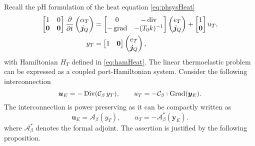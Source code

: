 Recall the pH formulation of the heat equation \eqref{eq:phsysHeat}
\begin{equation}
\begin{aligned}
\begin{bmatrix}
1 & 0 \\
\bm{0} & \bm{0} \\
\end{bmatrix}
\diffp{}{t}
\begin{pmatrix}
\alpha_T \\
\bm{j}_Q \\
\end{pmatrix} &= 
\begin{bmatrix}
0 & -\div \\
-\grad & -(T_0 k)^{-1} \\
\end{bmatrix}
\begin{pmatrix}
e_T \\
\bm{j}_Q \\
\end{pmatrix} + 
\begin{bmatrix}
1 \\
\bm{0} \\
\end{bmatrix} u_T, \\
y_T &= \begin{bmatrix}
1 & \bm{0} \\
\end{bmatrix} \begin{pmatrix}
e_T \\
\bm{j}_Q \\
\end{pmatrix},
\end{aligned}
\end{equation} 
with Hamiltonian $H_T$ defined in \eqref{eq:hamHeat}. The linear thermoelastic problem can be expressed as a coupled port-Hamiltonian system.  Consider the following interconnection
\begin{equation}
\bm{u}_E = - \Div(\mathcal{C}_\beta \, y_T), \qquad
u_T = - \mathcal{C}_\beta \cddot\Grad(\bm{y}_E). 
\end{equation}
The interconnection is power preserving as it can be compactly written as 
\begin{equation*}
\bm{u}_E = \mathcal{A}_\beta(y_T), \qquad u_T = - \mathcal{A}_\beta^*(\bm{y}_E).
\end{equation*}
where $\mathcal{A}_\beta^*$ denotes the formal adjoint. The assertion is justified by the following proposition.
